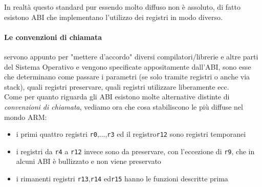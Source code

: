 \documentclass[class=book, crop=false]{standalone}
\begin{document}
In realtà questo standard pur essendo molto diffuso non è assoluto, di fatto esistono ABI che implementano l'utilizzo dei registri in modo diverso.\\

\paragraph{Le convenzioni di chiamata} servono appunto per "mettere d'accordo" diversi compilatori/librerie e altre parti del Sistema Operativo e vengono specificate appositamente dall'ABI, sono esse che determinano come passare i parametri (se solo tramite registri o anche via stack), quali registri preservare, quali registri utilizzare liberamente ecc.\\
Come per quanto riguarda gli ABI esistono molte alternative distinte di \emph{convenzioni di chiamata}, vediamo ora che cosa stabiliscono le più diffuse nel mondo ARM:
\begin{itemize}[nolistsep]
	\item i primi quattro registri \texttt{r0},...,\texttt{r3} ed il registro\texttt{r12} sono registri temporanei
	\item i registri da \texttt{r4} a \texttt{r12} invece sono da preservare, con l'eccezione di \texttt{r9}, che in alcuni ABI è bullizzato e non viene preservato
	\item i rimanenti registri \texttt{r13},\texttt{r14} ed\texttt{r15} hanno le funzioni descritte prima
\end{itemize}
\end{document}
